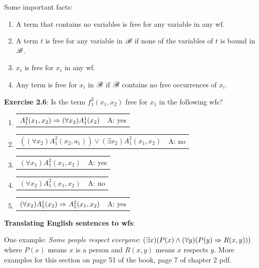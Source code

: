 \noindent
Some important facts:

\begin{enumerate}
    \item A term that contains no variables is free for any variable in any wf.
    \item A term $t$ is free for any variable in $\mathscr{B}$ if none of the variables of $t$ is bound in $\mathscr{B}$.
    \item $x_i$ is free for $x_i$ in any wf.
    \item Any term is free for $x_i$ in $\mathscr{B}$ if $\mathscr{B}$ contains no free occurrences of $x_i$.
\end{enumerate}

\noindent
\textbf{Exercise 2.6}: Is the term $f_1^2(x_1,x_2)$ free for $x_1$ in the following wfs?

\begin{enumerate} [label = \alph*.]
    \item \begin{tabular}{p{8cm} r}
            $A_1^2(x_1,x_2) \Rightarrow (\forall x_2)A_1^1(x_2)$ & A: yes
    \end{tabular}
    \item \begin{tabular}{p{8cm} r}
            $((\forall x_2)A_1^2(x_2,a_1)) \lor (\exists x_2) A_1^2(x_1, x_2)$ & A: no
    \end{tabular}
    \item \begin{tabular}{p{8cm} r}
            $(\forall x_1)A_1^2(x_1,x_2)$ & A: yes
    \end{tabular}
    \item \begin{tabular}{p{8cm} r}
            $(\forall x_2)A_1^2(x_1,x_2)$ & A: no
    \end{tabular}
    \item \begin{tabular}{p{8cm} r}
            $(\forall x_2)A_1^1(x_2) \Rightarrow A_1^2(x_1,x_2)$ & A: yes
    \end{tabular}
\end{enumerate} 

\noindent
\textbf{Translating English sentences to wfs}:

\noindent
One example: \textit{Some people respect everyone}: $(\exists x)(P(x) \land (\forall y)(P(y) \Rightarrow R(x,y)))$ where $P(x)$ means $x$ is a person and $R(x,y)$ means $x$ respects $y$. More examples for this section on page 51 of the book, page 7 of chapter 2 pdf.
